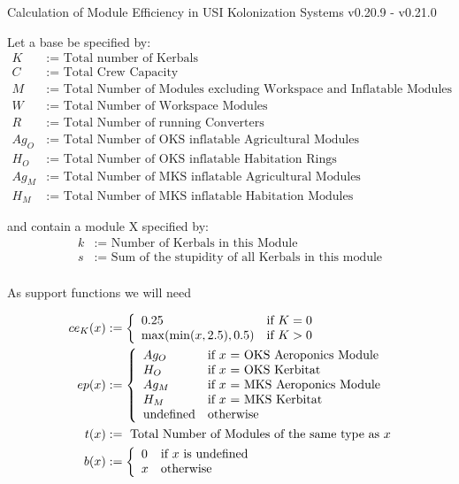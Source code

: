 \documentclass[11pt]{report}
\begin{document}
Calculation of Module Efficiency in USI Kolonization Systems v0.20.9 - v0.21.0

Let a base be specified by:
\begin{align*}
  K & := \textrm{ Total number of Kerbals}\\
  C & := \textrm{ Total Crew Capacity}\\
  M & := \textrm{ Total Number of Modules excluding Workspace and Inflatable Modules}\\
  W & := \textrm{ Total Number of Workspace Modules}\\
  R & := \textrm{ Total Number of running Converters}\\
  Ag_O & := \textrm{ Total Number of OKS inflatable Agricultural Modules}\\
  H_O & := \textrm{ Total Number of OKS inflatable Habitation Rings}\\
  Ag_M & := \textrm{ Total Number of MKS inflatable Agricultural Modules}\\
  H_M & := \textrm{ Total Number of MKS inflatable Habitation Modules}
\end{align*}

and contain a module X specified by:
\begin{align*}
  k & := \textrm{ Number of Kerbals in this Module}\\
  s & := \textrm{ Sum of the stupidity of all Kerbals in this module}\\
\end{align*}

As support functions we will need

\begin{align*}
ce_K(x) & := \left\{
  \begin{array}{l l}
    0.25 & \textrm{if } K = 0\\
    \max(\min(x, 2.5), 0.5) &\textrm{if } K > 0
  \end{array}
\right.\\
ep(x) & :=\left\{
  \begin{array}{l l}
    Ag_O & \textrm{if $x$ = OKS Aeroponics Module}\\
    H_O & \textrm{if $x$ = OKS Kerbitat}\\
    Ag_M & \textrm{if $x$ = MKS Aeroponics Module}\\
    H_M & \textrm{if $x$ = MKS Kerbitat}\\
    \textrm{undefined} & \textrm{otherwise}
  \end{array}
\right.\\
t(x) & := \textrm{ Total Number of Modules of the same type as $x$}\\
b(x) & := \left\{
  \begin{array}{l l}
    0 & \textrm{if $x$ is undefined}\\
    x & \textrm{otherwise}
  \end{array}
\right.
\end{align*}
\end{document}
